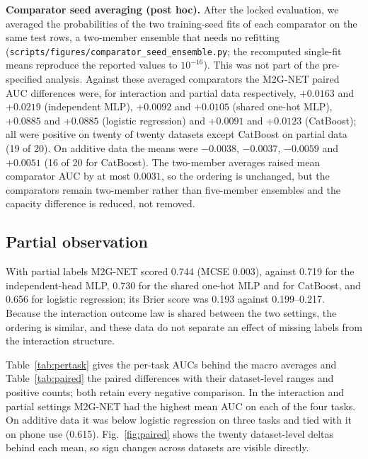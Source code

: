 \documentclass[9pt, conference, a4paper, compsocconf]{IEEEtran}
\begin{document}
\textbf{Comparator seed averaging (post hoc).} After the locked evaluation, we averaged the probabilities of the two training-seed fits of each comparator on the same test rows, a two-member ensemble that needs no refitting (\texttt{scripts/figures/comparator\_seed\_ensemble.py}; the recomputed single-fit means reproduce the reported values to $10^{-16}$). This was not part of the pre-specified analysis. Against these averaged comparators the M2G-NET paired AUC differences were, for interaction and partial data respectively, $+0.0163$ and $+0.0219$ (independent MLP), $+0.0092$ and $+0.0105$ (shared one-hot MLP), $+0.0885$ and $+0.0885$ (logistic regression) and $+0.0091$ and $+0.0123$ (CatBoost); all were positive on twenty of twenty datasets except CatBoost on partial data (19 of 20). On additive data the means were $-0.0038$, $-0.0037$, $-0.0059$ and $+0.0051$ (16 of 20 for CatBoost). The two-member averages raised mean comparator AUC by at most $0.0031$, so the ordering is unchanged, but the comparators remain two-member rather than five-member ensembles and the capacity difference is reduced, not removed.

\subsection{Partial observation}
With partial labels M2G-NET scored 0.744 (MCSE 0.003), against 0.719 for the independent-head MLP, 0.730 for the shared one-hot MLP and for CatBoost, and 0.656 for logistic regression; its Brier score was 0.193 against 0.199--0.217. Because the interaction outcome law is shared between the two settings, the ordering is similar, and these data do not separate an effect of missing labels from the interaction structure.

Table~\ref{tab:pertask} gives the per-task AUCs behind the macro averages and Table~\ref{tab:paired} the paired differences with their dataset-level ranges and positive counts; both retain every negative comparison. In the interaction and partial settings M2G-NET had the highest mean AUC on each of the four tasks. On additive data it was below logistic regression on three tasks and tied with it on phone use (0.615). Fig.~\ref{fig:paired} shows the twenty dataset-level deltas behind each mean, so sign changes across datasets are visible directly.
\end{document}
